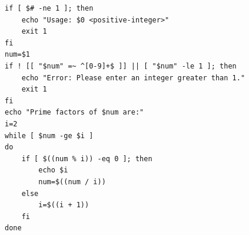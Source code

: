 \begin{verbatim}
if [ $# -ne 1 ]; then
    echo "Usage: $0 <positive-integer>"
    exit 1
fi
num=$1
if ! [[ "$num" =~ ^[0-9]+$ ]] || [ "$num" -le 1 ]; then
    echo "Error: Please enter an integer greater than 1."
    exit 1
fi
echo "Prime factors of $num are:"
i=2
while [ $num -ge $i ]
do
    if [ $((num % i)) -eq 0 ]; then
        echo $i
        num=$((num / i))
    else
        i=$((i + 1))
    fi
done
\end{verbatim}